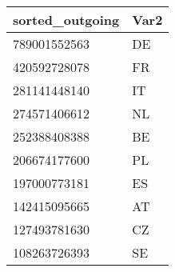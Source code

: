 \begin{tabular}{ll}
sorted_outgoing & Var2 \\ 
\hline 
789001552563 & DE \\ 
420592728078 & FR \\ 
281141448140 & IT \\ 
274571406612 & NL \\ 
252388408388 & BE \\ 
206674177600 & PL \\ 
197000773181 & ES \\ 
142415095665 & AT \\ 
127493781630 & CZ \\ 
108263726393 & SE \\ 
\hline 
\end{tabular}